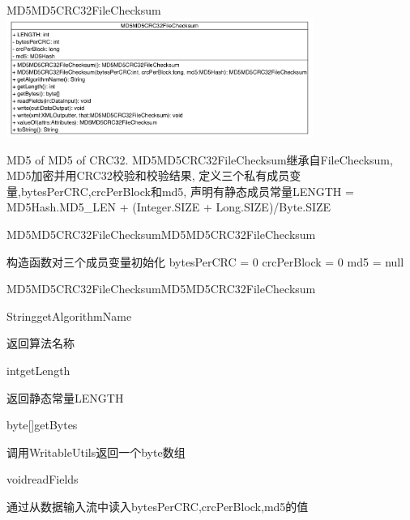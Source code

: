 \begin{XeClass}{MD5MD5CRC32FileChecksum}
\includegraphics[width=10cm]{cdig/MD5MD5CRC32FileChecksum.png}
     
 MD5 of MD5 of CRC32.
 MD5MD5CRC32FileChecksum继承自FileChecksum,
 MD5加密并用CRC32校验和校验结果,
 定义三个私有成员变量,bytesPerCRC,crcPerBlock和md5,
 声明有静态成员常量LENGTH = MD5Hash.MD5_LEN + (Integer.SIZE + Long.SIZE)/Byte.SIZE

    \begin{XeMethod}{\XePublic}{MD5MD5CRC32FileChecksum}{MD5MD5CRC32FileChecksum}
         
 构造函数对三个成员变量初始化
 bytesPerCRC = 0
 crcPerBlock = 0
 md5 = null

    \end{XeMethod}

    \begin{XeMethod}{\XePublic}{MD5MD5CRC32FileChecksum}{MD5MD5CRC32FileChecksum}
         

    \end{XeMethod}

    \begin{XeMethod}{\XePublic}{String}{getAlgorithmName}
         
 返回算法名称

    \end{XeMethod}

    \begin{XeMethod}{\XePublic}{int}{getLength}
         
 返回静态常量LENGTH

    \end{XeMethod}

    \begin{XeMethod}{\XePublic}{byte[]}{getBytes}
         
 调用WritableUtils返回一个byte数组

    \end{XeMethod}

    \begin{XeMethod}{\XePublic}{void}{readFields}
         
 通过从数据输入流中读入bytesPerCRC,crcPerBlock,md5的值


\end{XeMethod}
\end{XeClass}

